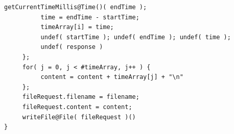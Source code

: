 \documentclass[12pt,a4paper]{article}
\begin{document}
\begin{appendices}
\begin{lstlisting}[caption={Example service client},label={lst:exampleServiceClient}]
          getCurrentTimeMillis@Time()( endTime );                                                                                                                                                            
          time = endTime - startTime;                                                                                                                                                                        
          timeArray[i] = time;                                                                                                                                                                               
          undef( startTime ); undef( endTime ); undef( time ); 
          undef( response )                                                                                                                                                                                  
     };                                                                                                                                                                                                                                                                                                                                                                                                                                                                                                                                                                                                                                
     for( j = 0, j < #timeArray, j++ ) {                                                                                                                                                                     
          content = content + timeArray[j] + "\n"                                                                                                                                                            
     };                                                                                                                                                                                                                                                                                                                                                                                                                   
     fileRequest.filename = filename;                                                                                                                                                                        
     fileRequest.content = content;                                                                                                                                                                          
     writeFile@File( fileRequest )() 
}
\end{lstlisting}
\end{appendices}
\end{document}
